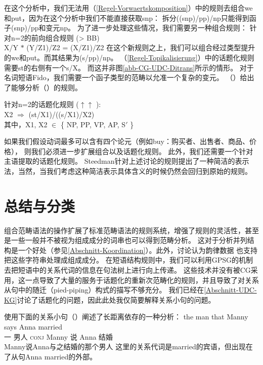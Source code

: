 在这个分析中，我们无法用（\ref{Regel-Vorwaertskomposition}）中的规则去组合we和put，因为在这个分析中我们不能直接获取s\bs np：
拆分((s\bs np)/pp)/np只能得到函子(s\bs np)/pp和变元np。
为了进一步处理这些情况，我们需要另一种组合规则：
\ea
针对n=2的前向组合规则 (> BB)\\
X/Y $*$ (Y/Z1)/Z2 = (X/Z1)/Z2
\z
在这个新规则之上，我们可以组合经过类型提升的we和put。而其结果为(s/pp)/np。
（\ref{Regel-Topikalisierung}）中的话题化规则需要st的右侧有一个s/X。
而这并非图\ref{abb-CG-UDC-Ditrans}所示的情形。
对于名词短语Fido，我们需要一个函子类型的范畴以允准一个复杂的变元。
（）给出了能够分析（）的规则。

\ea
\label{Regel-Topikalisierung-zwei}
针对n=2的话题化规则
 ($\uparrow\uparrow$
\isc{$\uparrow\uparrow$}
\is{$\uparrow\uparrow$}):\\
X2 $\Rightarrow$ (st/X1)/((s/X1)/X2)\\
其中，X1, X2 $\in$ \{ NP, PP, VP, AP, S$'$ \}
\z

\noindent
如果我们假设动词最多可以含有四个论元（例如buy：购买者、出售者、商品、价格），
则我们必须进一步扩展组合以及话题化规则。
此外，我们还需要一个针对主语提取的话题化规则\citep[]{Pollard88a}。
Steedman针对上述讨论的规则提出了一种简洁的表示法，当然，当我们考虑这种简洁表示具体含义的时候仍然会回归到原始的规则。 

\section{总结与分类}
\label{Abschnitt-Relativsaetze-CG}\label{Abschnitt-Ratte-CG}\label{sec-pied-piping-cg}

组合范畴语法的操作扩展了标准范畴语法的规则系统，增强了规则的灵活性，甚至是一些一般并不被视为组成成分的词串也可以得到范畴分析。
这对于分析并列结构是一个好处（参见\ref{Abschnitt-Koordination}）。此外，\citet{Steedman91a}讨论认为韵律数据
也支持把这些字符串处理成组成成分。
在短语结构规则中，我们可以利用GPSG的机制去把短语中的关系代词的信息在句法树上进行向上传递。
这些技术并没有被CG采用，这一点导致了大量的服务于话题化的重新次范畴化的规则，并且导致了对关系从句中的随迁（pied-piping）构式的描写不够充分。
我们已经在\ref{Abschnitt-UDC-KG}讨论了话题化的问题，因此此处我仅简要解释关系小句的问题。

\citet[]{SB2006a-u}使用下面的关系小句（）阐述了长距离依存的一种分析：
\ea
\gll the man  that Manny says Anna married \\
     一 男人 \textsc{conj} Manny 说 Anna 结婚 \\
\glt Manny说Anna与之结婚的那个男人
\z
这里的关系代词是married的宾语，但出现在了从句Anna married的外部。


